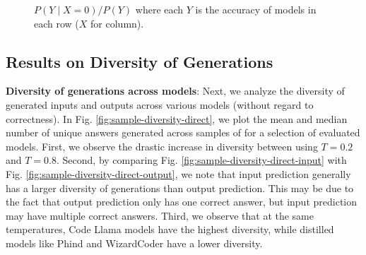 \begin{figure}[H]
\begin{subfigure}[b]{0.49\textwidth}
     \end{subfigure}
     \caption{$P(Y \mid X=0) / P(Y)$ where each $Y$ is the accuracy of models in each row ($X$ for column). }
     \label{fig:error_prob-input-output}
\end{figure}

\subsection{Results on Diversity of Generations} \label{sec:appendix-diversity}

\textbf{Diversity of generations across models}: Next, we analyze the diversity of generated inputs and outputs across various models (without regard to correctness). In Fig. \ref{fig:sample-diversity-direct}, we plot the mean and median number of unique answers generated across samples of \benchmark for a selection of evaluated models. First, we observe the drastic increase in diversity between using $T=0.2$ and $T=0.8$. Second, by comparing Fig. \ref{fig:sample-diversity-direct-input} with Fig. \ref{fig:sample-diversity-direct-output}, we note that input prediction generally has a larger diversity of generations than output prediction. This may be due to the fact that output prediction only has one correct answer, but input prediction may have multiple correct answers. Third, we observe that at the same temperatures, Code Llama models have the highest diversity, while distilled models like Phind and WizardCoder have a lower diversity.


